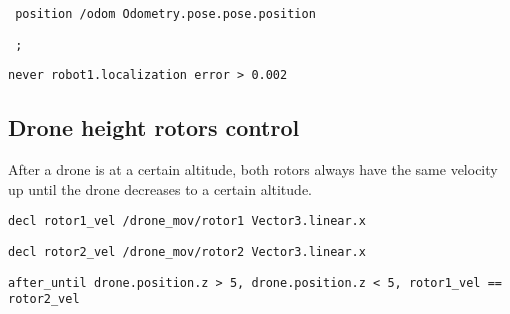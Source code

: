 \texttt{    position /odom Odometry.pose.pose.position}

\texttt{    ;}

\texttt{never robot1.localization error > 0.002}


\subsection{Drone height rotors control}
\label{ssec:rotorsexample}

After a drone is at a certain altitude, both rotors always have the same velocity up until the drone decreases to a certain altitude.

\texttt{decl rotor1\_vel /drone\_mov/rotor1 Vector3.linear.x}

\texttt{decl rotor2\_vel /drone\_mov/rotor2 Vector3.linear.x}

\texttt{after\_until drone.position.z > 5, drone.position.z < 5, rotor1\_vel == rotor2\_vel}
